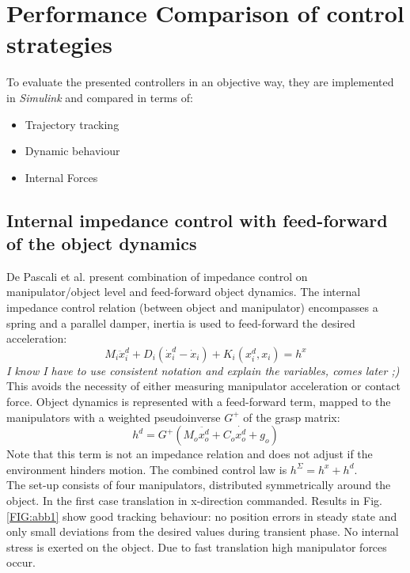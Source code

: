 \documentclass[a4paper,twoside, openright,12pt]{report}
\begin{document}
\section{Performance Comparison of control strategies}

To evaluate the presented controllers in an objective way, they are implemented in \emph{Simulink} and compared in terms of:
\begin{itemize}
	\item Trajectory tracking
	\item Dynamic behaviour
	\item Internal Forces
\end{itemize}


\subsection{Internal impedance control with feed-forward of the object dynamics}
De Pascali et al. \cite{DePascali_15} present combination of impedance control on manipulator/object level and feed-forward object dynamics. The internal impedance control relation (between object and manipulator) encompasses a spring and a parallel damper, inertia is used to feed-forward the desired acceleration: 
\begin{equation}
M_i \ddot{x}_i^d + D_i (\dot{x}_i^d - \dot{x}_i) + K_i(x_i^d,x_i) = h^x
\end{equation}
\textit{I know I have to use consistent notation and explain the variables, comes later ;)}
This avoids the necessity of either measuring manipulator acceleration or contact force.
Object dynamics is represented with a feed-forward term, mapped to the manipulators with a weighted pseudoinverse $ G^+ $ of the grasp matrix:
\begin{equation}
h^d = G^+ (M_o \ddot{x_o^d} + C_o \dot{x_o^d} + g_o)
\end{equation}
Note that this term is not an impedance relation and does not adjust if the environment hinders motion.
The combined control law is $ h^\Sigma = h^x + h^d $.\\
The set-up consists of four manipulators, distributed symmetrically around the object. In the first case translation in x-direction commanded. Results in Fig. \ref{FIG:abb1} show good tracking behaviour: no position errors in steady state and only small deviations from the desired values during transient phase. No internal stress is exerted on the object. Due to fast translation high manipulator forces occur.
\end{document}
